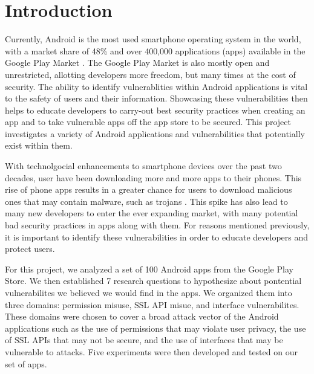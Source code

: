 \section{Introduction}




Currently, Android is the most used smartphone operating system in the world, with a market share of 48\% and over 400,000 applications (apps) available in the Google Play Market \cite{10.1145/2382196.2382205}. The Google Play
Market is also mostly open and unrestricted, allotting developers more freedom, but many times at the cost of security. 
The ability to identify vulnerablities within Android applications is vital to the safety of users and their information. Showcasing these vulnerabilities then
helps to educate developers to carry-out best security practices when creating an app and to take vulnerable apps off the app store to be secured. This project investigates a variety of Android applications and vulnerabilities that potentially 
exist within them. 

With technolgocial enhancements to smartphone devices over the past two decades, user have been downloading more and more apps to their phones. This rise of phone apps results in a greater chance for users to download malicious ones 
that may contain malware, such as trojans \cite{10.1145/1653662.1653691}. This spike has also lead to many new developers to enter the ever expanding market, with many potential bad security practices in apps along with them. For reasons mentioned previously, 
it is important to identify these vulnerabilities in order to educate developers and protect users. 

For this project, we analyzed a set of 100 Android apps from the Google Play Store. We then established 7 research questions to hypothesize about pontential vulnerabilites we believed we would find in the apps. We organized them into three domains: permission misuse, 
SSL API misue, and interface vulnerabilites. These domains were chosen to cover a broad attack vector of the Android applications such as the use of permissions that may violate user privacy, the use of SSL APIs that may not be secure, and the use of interfaces that may be vulnerable to attacks.
Five experiments were then developed and tested on our set of apps. 

